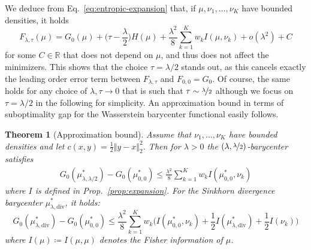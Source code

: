 \documentclass[11pt]{article}
\newcommand{\rev}[1]{{#1}}
\newcommand{\RR}{\mathbb{R}}
\newtheorem{theorem}{Theorem}[section]
\begin{document}
\rev{We deduce from Eq.~\eqref{eq:entropic-expansion} that, if $\mu,\nu_1,\dots,\nu_K$ have bounded densities, it holds
$$
F_{\lambda,\tau}(\mu) = G_0(\mu) +\big(\tau-\frac{\lambda}{2}\big)H(\mu) +\frac{\lambda^2}{8} \sum_{k=1}^K w_k I(\mu,\nu_k) +o(\lambda^2) + C
$$
for some $C\in \RR$ that does not depend on $\mu$, and thus does not affect the minimizers. This shows that the choice $\tau=\lambda/2$ stands out, as this cancels exactly the leading order error term between $F_{\lambda,\tau}$ and $F_{0,0}=G_0$. Of course, the same holds for any choice of $\lambda,\tau\to 0$ that is such that $\tau \sim \nicefrac{\lambda}{2}$ although we focus on $\tau=\lambda/2$ in the following for simplicity.} An approximation bound in terms of suboptimality gap for the Wasserstein barycenter functional easily follows.
\begin{assbox}
\begin{theorem}[Approximation bound]\label{thm:approx}
Assume that $\nu_1,\dots,\nu_K$ have bounded densities and let $c(x,y)=\frac12\Vert y-x\Vert_2^2$. Then for $\lambda>0$ the $(\lambda,\nicefrac{\lambda}2)$-barycenter satisfies
\begin{align}
G_0(\mu^*_{\lambda,\lambda/2})-G_0(\mu^*_{0,0})\leq \frac{\lambda^2 }{8} \sum_{k=1}^K w_k I(\mu^*_{0,0},\nu_k)
\end{align}
where $I$ is defined in Prop.~\ref{prop:expansion}. For the Sinkhorn divergence barycenter \rev{$\mu^{*}_{\lambda,\mathrm{div}}$}, it holds:
$$
G_0(\mu^{*}_{\lambda,\mathrm{div}})-G_0(\mu^*_{0,0})\leq \frac{\lambda^2}{8}\sum_{k=1}^K w_k \Big(I(\mu^*_{0,0},\nu_k) +\frac12 I(\mu^*_{\lambda,\mathrm{div}})+\frac12 I(\nu_k)\Big)
$$
where $I(\mu)\coloneqq I(\mu,\mu)$ denotes the Fisher information of $\mu$.
\end{theorem}
\end{assbox}
\end{document}
